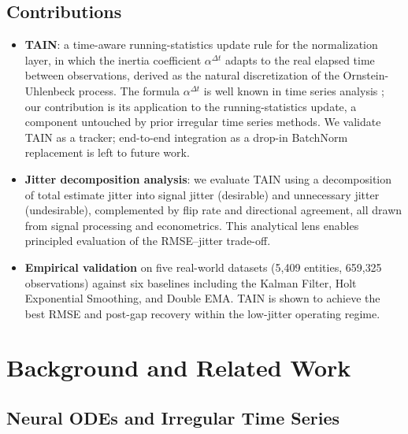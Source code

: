 \documentclass[11pt,a4paper]{article}
\begin{document}
\subsection{Contributions}

\begin{itemize}[leftmargin=1.5em,itemsep=4pt]
  \item \textbf{TAIN}: a time-aware running-statistics update rule for the
    normalization layer, in which the inertia coefficient
    $\alpha^{\Delta t}$ adapts to the real elapsed time between observations,
    derived as the natural discretization of the Ornstein-Uhlenbeck process. The
    formula $\alpha^{\Delta t}$ is well known in time series analysis
    \citep{wright1986,zumbach2001operators}; our contribution is its application to
    the running-statistics update, a component untouched by prior irregular time
    series methods. We validate TAIN as a tracker; end-to-end integration as a
    drop-in BatchNorm replacement is left to future work.

  \item \textbf{Jitter decomposition analysis}: we evaluate TAIN using a
    decomposition of total estimate jitter into signal jitter (desirable) and
    unnecessary jitter (undesirable), complemented by flip rate and directional
    agreement, all drawn from signal processing and econometrics. This
    analytical lens enables principled evaluation of the RMSE--jitter trade-off.

  \item \textbf{Empirical validation} on five real-world datasets (5{,}409
    entities, 659{,}325 observations) against six baselines including the
    Kalman Filter, Holt Exponential Smoothing, and Double EMA. TAIN is
    shown to achieve the best RMSE and post-gap recovery within the
    low-jitter operating regime.
\end{itemize}

\section{Background and Related Work}

\subsection{Neural ODEs and Irregular Time Series}
\end{document}
